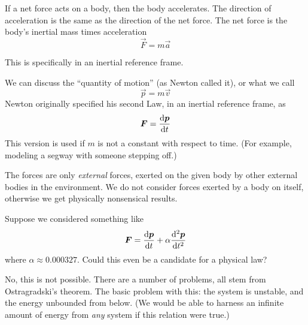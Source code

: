 \label{M:newton:second}
If a net force acts on a body, then the body accelerates. The direction
of acceleration is the same as the direction of the net force. The net
force is the body's inertial mass times acceleration
\begin{equation}
  \vec{F} = m\vec{a}
\end{equation}
\begin{remark}
  This is specifically in an inertial reference frame.
\end{remark}
\begin{remark}
  We can discuss the ``quantity of motion'' (as Newton called it), or
  what we call 
  \begin{equation}
    \vec{p} = m\vec{v}
  \end{equation}
  Newton originally specified his second Law, in an inertial reference
  frame, as
  \begin{equation}
    \vec{F} = \frac{\D\vec{p}}{\D t}
  \end{equation}
  This version is used if $m$ is not a constant with respect to
  time. (For example, modeling a segway with someone stepping off.)
\end{remark}
\begin{remark}
The forces are only \emph{external} forces, exerted on the given body by
other external bodies in the environment. We do not consider forces
exerted by a body on itself, otherwise we get physically nonsensical
results.
\end{remark}

Suppose we considered something like
\begin{equation}
\vec{F} = \frac{\D\vec{p}}{\D t} + \alpha\frac{\D^{2}\vec{p}}{\D t^{2}}
\end{equation}
where $\alpha\approx 0.000327$. Could this even be a candidate for a
physical law?

No, this is not possible. There are a number of problems, all stem from
Ostragradski's theorem. The basic problem with this: the system is
unstable, and the energy unbounded from below. (We would be able to
harness an infinite amount of energy from \emph{any} system if this
relation were true.)

